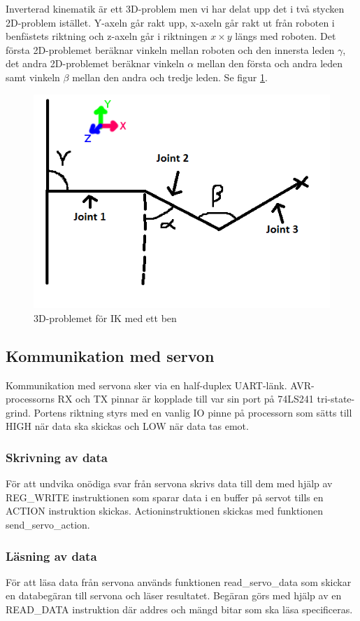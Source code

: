 \documentclass[a4paper,titlepage,12pt]{article}
\begin{document}
	Inverterad kinematik är ett 3D-problem men vi har delat upp det i två
    stycken 2D-problem istället. Y-axeln går rakt upp, x-axeln går rakt ut från
    roboten i benfästets riktning och z-axeln går i riktningen $x \times y$
    längs med roboten. Det första 2D-problemet beräknar vinkeln mellan roboten
    och den innersta leden $\gamma$, det andra 2D-problemet beräknar vinkeln
    $\alpha$ mellan den första och andra leden samt vinkeln $\beta$ mellan den
    andra och tredje leden. Se figur \ref{fig:ik}.
	
	
	\begin{figure}[h!]
		\centering
		\includegraphics[width=0.5\linewidth]{images/ik.png}
		\caption{3D-problemet för IK med ett ben
		\label{fig:ik}}
	\end{figure}

	\subsection{Kommunikation med servon}
	Kommunikation med servona sker via en half-duplex UART-länk. AVR-processorns RX
	och TX pinnar är kopplade till var sin port på 74LS241 tri-state-grind. Portens riktning
	styrs med en vanlig IO pinne på processorn som sätts till HIGH när data ska skickas 
	och LOW när data tas emot. 

	\subsubsection{Skrivning av data}
	För att undvika onödiga svar från servona skrivs data till dem med hjälp av REG\_WRITE
	instruktionen som sparar data i en buffer på servot tills en ACTION instruktion skickas.
	Actioninstruktionen skickas med funktionen send\_servo\_action.
	
	\subsubsection{Läsning av data}
	För att läsa data från servona används funktionen read\_servo\_data som skickar en 
	databegäran till servona och läser resultatet. Begäran görs med hjälp av en
	READ\_DATA instruktion där addres och mängd bitar som ska läsa specificeras.
	
\end{document}
